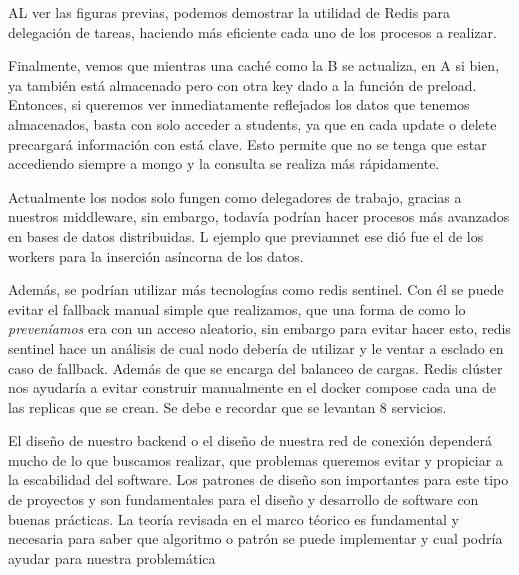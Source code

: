 AL ver las figuras previas, podemos demostrar la utilidad de Redis para delegación de tareas, haciendo más eficiente cada uno de los procesos a realizar.


Finalmente, vemos que mientras una caché como la B se actualiza, en A si bien, ya también está almacenado pero con otra key dado a la función de preload. Entonces, si queremos ver inmediatamente reflejados los datos que tenemos almacenados, basta con solo acceder a students, ya que en cada update o delete precargará información con está clave. Esto permite que no se tenga que estar accediendo siempre a mongo y la consulta se realiza más rápidamente.

Actualmente los nodos solo fungen como delegadores de trabajo, gracias a nuestros middleware, sin embargo, todavía podrían hacer procesos más avanzados en bases de datos distribuidas. L ejemplo que previamnet ese dió fue el de los workers para la inserción asíncorna de los datos.

Además, se podrían utilizar más tecnologías como redis sentinel. Con él se puede evitar el fallback manual simple que realizamos, que una forma de como lo \textit{preveníamos} era con un acceso aleatorio, sin embargo para evitar hacer esto, redis sentinel hace un análisis de cual nodo debería de utilizar y le ventar a esclado en caso de fallback. Además de que se encarga del balanceo de cargas. Redis clúster nos ayudaría a evitar construir manualmente en el docker compose cada una de las replicas que se crean. Se debe e recordar que se levantan 8 servicios.

El diseño de nuestro backend o el diseño de nuestra red de conexión dependerá mucho de lo que buscamos realizar, que problemas queremos evitar y propiciar a la escabilidad del software. Los patrones de diseño son importantes para este tipo de proyectos y son fundamentales para el diseño y desarrollo de software con buenas prácticas. La teoría revisada en el marco téorico es fundamental y necesaria para saber que algoritmo o patrón se puede implementar y cual podría ayudar para nuestra problemática
